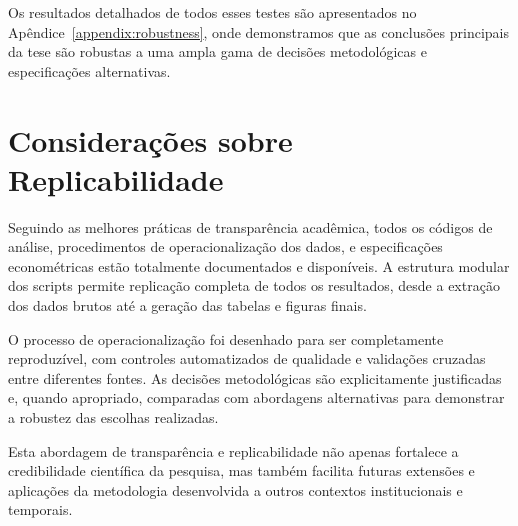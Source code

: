 Os resultados detalhados de todos esses testes são apresentados no Apêndice~\ref{appendix:robustness}, onde demonstramos que as conclusões principais da tese são robustas a uma ampla gama de decisões metodológicas e especificações alternativas.

\section{Considerações sobre Replicabilidade}

Seguindo as melhores práticas de transparência acadêmica, todos os códigos de análise, procedimentos de operacionalização dos dados, e especificações econométricas estão totalmente documentados e disponíveis. A estrutura modular dos scripts permite replicação completa de todos os resultados, desde a extração dos dados brutos até a geração das tabelas e figuras finais.

O processo de operacionalização foi desenhado para ser completamente reproduzível, com controles automatizados de qualidade e validações cruzadas entre diferentes fontes. As decisões metodológicas são explicitamente justificadas e, quando apropriado, comparadas com abordagens alternativas para demonstrar a robustez das escolhas realizadas.

Esta abordagem de transparência e replicabilidade não apenas fortalece a credibilidade científica da pesquisa, mas também facilita futuras extensões e aplicações da metodologia desenvolvida a outros contextos institucionais e temporais.